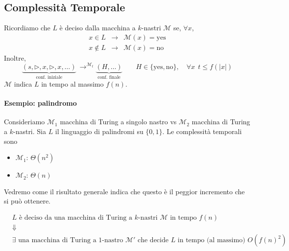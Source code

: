 \subsection{Complessità Temporale}
Ricordiamo che $L$ è deciso dalla macchina a $k$-nastri $\mathcal{M}$ se, $\forall x$,
\begin{eqnarray*}
    x\in L &\to& \mathcal{M}(x)=\text{yes}\\
    x\notin L &\to& \mathcal{M}(x)=\text{no}
\end{eqnarray*}
Inoltre,
$$
    \underbrace{(s,\rhd,x,\rhd,x,\dots)}_{\text{conf.~iniziale}}
     ~\to^{\mathcal{M}_t}
    \underbrace{(H,\dots)}_{\text{conf.~finale}}
    \qquad
    H\in\{\text{yes},\text{no}\}, \quad 
    \forall x ~~ t\leq f(|x|)
$$
$\mathcal{M}$ indica $L$ in tempo al massimo $f(n)$.

\paragraph{Esempio: palindromo} Consideriamo $\mathcal{M}_1$ macchina di Turing a singolo nastro vs $\mathcal{M}_2$ macchina di Turing a $k$-nastri. Sia $L$ il linguaggio di palindromi su $\{0,1\}$. Le complessità temporali sono 
\begin{itemize}
    \item $\mathcal{M}_1$: $\Theta(n^2)$
    \item $\mathcal{M}_2$: $\Theta(n)$
\end{itemize}
Vedremo come il risultato generale indica che questo è il peggior incremento che si può ottenere.

\begin{theorem}
    \begin{eqnarray*}
        &L \text{ è deciso da una macchina di Turing a } k \text{-nastri } \mathcal{M} \text{ in tempo } f(n)&\\
        &\Downarrow&\\
        &\exists \text{ una macchina di Turing a 1-nastro } \mathcal{M}' \text{ che decide } L \text{ in tempo (al massimo) } O(f(n)^2)&
    \end{eqnarray*}
\end{theorem}

